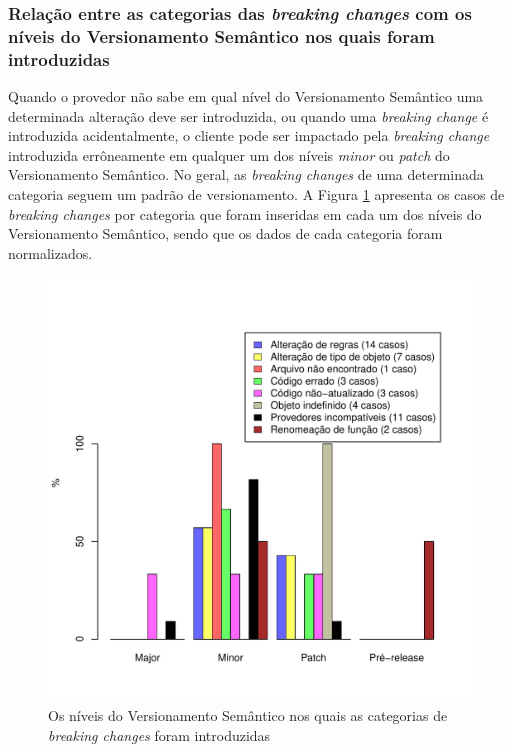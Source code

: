 \subsubsection{Relação entre as categorias das \textit{breaking changes} com os níveis do Versionamento Semântico nos quais foram introduzidas}


Quando o provedor não sabe em qual nível do Versionamento Semântico uma determinada alteração deve ser introduzida, ou quando uma \textit{breaking change} é introduzida acidentalmente, o cliente pode ser impactado pela \textit{breaking change} introduzida  errôneamente em qualquer um dos níveis \textit{minor} ou \textit{patch} do Versionamento Semântico. No geral, as \textit{breaking changes} de uma determinada categoria seguem um padrão de versionamento. A Figura \ref{fig:semver_types} apresenta os casos de \textit{breaking changes} por categoria que foram inseridas em cada um dos níveis do Versionamento Semântico, sendo que os dados de cada categoria foram normalizados. 

\begin{figure}[!h]
	\centering
	\includegraphics[scale=0.65]{figuras/semver_types.pdf}
	\caption{Os níveis do Versionamento Semântico nos quais as categorias de \textit{breaking changes} foram introduzidas}
	\label{fig:semver_types}
\end{figure}{}

